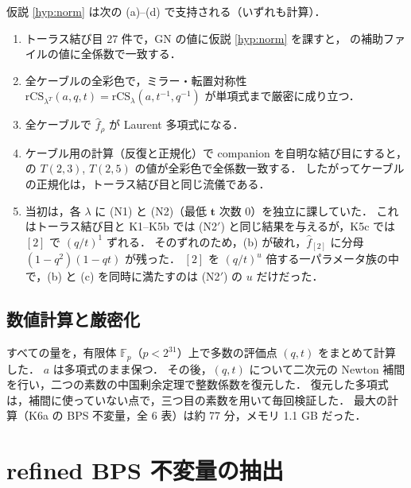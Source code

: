\documentclass[11pt,a4paper]{ltjsarticle}
\theoremstyle{definition}
\theoremstyle{remark}
\newcommand{\bt}{\mathbf{t}}
\newcommand{\hf}{\widehat{f}}
\begin{document}
仮説 \ref{hyp:norm} は次の (a)--(d) で支持される（いずれも計算）．
\begin{enumerate}
\item[(a)] トーラス結び目 27 件で，GN の値に仮説 \ref{hyp:norm} を課すと，\cite{KN} の補助ファイルの値に全係数で一致する．
\item[(b)] 全ケーブルの全彩色で，ミラー・転置対称性 $\mathrm{rCS}_{\lambda^T}(a,q,t)=\mathrm{rCS}_\lambda(a,t^{-1},q^{-1})$ が単項式まで厳密に成り立つ．
\item[(c)] 全ケーブルで $\hf_\rho$ が Laurent 多項式になる．
\item[(c$'$)] ケーブル用の計算（反復と正規化）で companion を自明な結び目にすると，\cite{KN} の $T(2,3)$, $T(2,5)$ の値が全彩色で全係数一致する．
  したがってケーブルの正規化は，トーラス結び目と同じ流儀である．
\item[(d)] 当初は，各 $\lambda$ に (N1) と (N2)（最低 $\bt$ 次数 $0$）を独立に課していた．
  これはトーラス結び目と K1--K5b では (N2$'$) と同じ結果を与えるが，K5c では $[2]$ で $(q/t)^1$ ずれる．
  そのずれのため，(b) が破れ，$\hf_{[2]}$ に分母 $(1-q^2)(1-qt)$ が残った．
  $[2]$ を $(q/t)^u$ 倍する一パラメータ族の中で，(b) と (c) を同時に満たすのは (N2$'$) の $u$ だけだった．
\end{enumerate}

\subsection{数値計算と厳密化}

すべての量を，有限体 $\mathbb{F}_p$（$p<2^{31}$）上で多数の評価点 $(q,t)$ をまとめて計算した．
$a$ は多項式のまま保つ．
その後，$(q,t)$ について二次元の Newton 補間を行い，二つの素数の中国剰余定理で整数係数を復元した．
復元した多項式は，補間に使っていない点で，三つ目の素数を用いて毎回検証した．
最大の計算（K6a の BPS 不変量，全 6 表）は約 77 分，メモリ 1.1 GB だった．

\section{refined BPS 不変量の抽出}\label{sec:bps}
\end{document}
